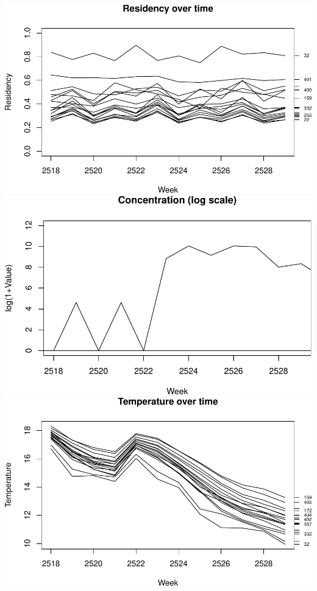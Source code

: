 \documentclass[
]{article}
\begin{document}
\includegraphics{habmodel_files/figure-latex/unnamed-chunk-6-1.pdf}
\includegraphics{habmodel_files/figure-latex/unnamed-chunk-6-2.pdf}
\includegraphics{habmodel_files/figure-latex/unnamed-chunk-6-3.pdf}
\end{document}
